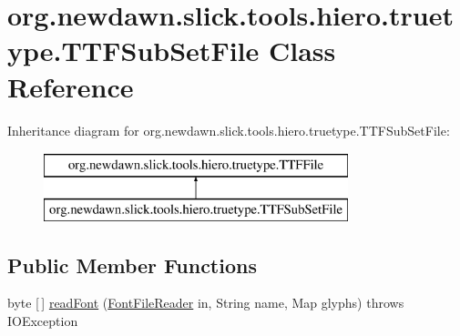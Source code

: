 \hypertarget{classorg_1_1newdawn_1_1slick_1_1tools_1_1hiero_1_1truetype_1_1_t_t_f_sub_set_file}{}\section{org.\+newdawn.\+slick.\+tools.\+hiero.\+truetype.\+T\+T\+F\+Sub\+Set\+File Class Reference}
\label{classorg_1_1newdawn_1_1slick_1_1tools_1_1hiero_1_1truetype_1_1_t_t_f_sub_set_file}
Inheritance diagram for org.\+newdawn.\+slick.\+tools.\+hiero.\+truetype.\+T\+T\+F\+Sub\+Set\+File\+:\begin{figure}[H]
\begin{center}
\leavevmode
\includegraphics[height=2.000000cm]{classorg_1_1newdawn_1_1slick_1_1tools_1_1hiero_1_1truetype_1_1_t_t_f_sub_set_file}
\end{center}
\end{figure}
\subsection*{Public Member Functions}
\begin{DoxyCompactItemize}
\item 
byte \mbox{[}$\,$\mbox{]} \mbox{\hyperlink{classorg_1_1newdawn_1_1slick_1_1tools_1_1hiero_1_1truetype_1_1_t_t_f_sub_set_file_ad5d399f66e450012f6255ee48945c6ea}{read\+Font}} (\mbox{\hyperlink{classorg_1_1newdawn_1_1slick_1_1tools_1_1hiero_1_1truetype_1_1_font_file_reader}{Font\+File\+Reader}} in, String name, Map glyphs)  throws I\+O\+Exception 
\end{DoxyCompactItemize}
